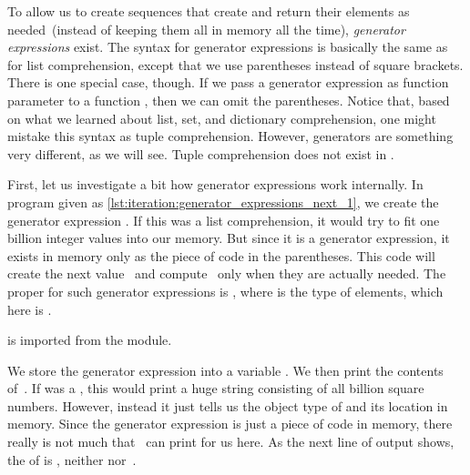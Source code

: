 To allow us to create  sequences that create and return their elements as needed~(instead of keeping them all in memory all the time), \emph{generator expressions} exist.
The syntax for generator expressions is basically the same as for list comprehension, except that we use parentheses instead of square brackets.
There is one special case, though.
If we pass a generator expression as function parameter to a function , then we can omit the parentheses.%
%
%
\FloatBarrier%
%
%
%
\afterpage{\afterpage{\clearpage}}%
%
%
%
%
Notice that, based on what we learned about list, set, and dictionary comprehension, one might mistake this syntax as tuple comprehension.
However, generators are something very different, as we will see.
Tuple comprehension does not exist in \python.%
%
\begin{sloppypar}%
First, let us investigate a bit how generator expressions work internally.
In program  given as \cref{lst:iteration:generator_expressions_next_1}, we create the generator expression .
If this was a list comprehension, it would try to fit one billion integer values into our memory.
But since it is a generator expression, it exists in memory only as the piece of code in the parentheses.
This code will create the next value~ and compute~ only when they are actually needed.
The proper  for such generator expressions is , where  is the type of elements, which here is .

 is imported from the  module.%
\end{sloppypar}%
%
We store the generator expression into a variable .
We then print the contents of~.
If  was a , this would print a huge string consisting of all billion square numbers.
However, instead it just tells us the object type of  and its location in memory.
Since the generator expression is just a piece of code in memory, there really is not much that \python\ can print for us here.
As the next line of output shows, the  of  is , neither  nor~.


